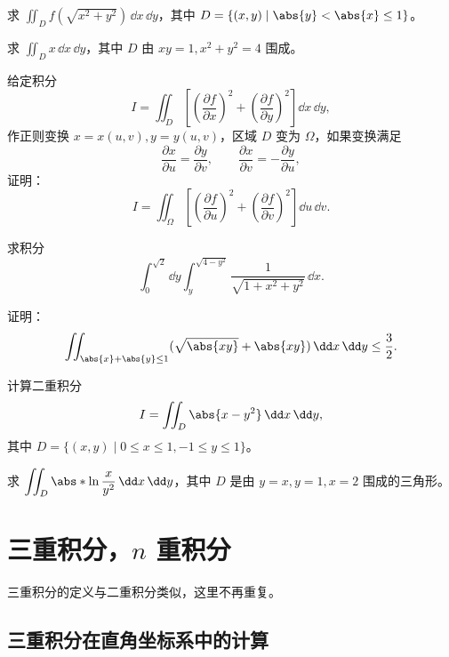 \begin{xexercise}[11]
求 $\displaystyle\iint_D f(\sqrt{x^2+y^2})\,\dd x\,\dd y$，其中 $D=\{(x,y)\mid\abs{y}<\abs{x}\le1\}$。
\end{xexercise}

\begin{xexercise}[12]
求 $\displaystyle\iint_D x\,\dd x\,\dd y$，其中 $D$ 由 $xy=1,x^2+y^2=4$ 围成。
\end{xexercise}

\begin{xexercise}[13]
给定积分
  \[
    I=\iint_D\left[\left(\frac{\partial f}{\partial x}\right)^2+\left(\frac{\partial f}{\partial y}\right)^2\right]\dd x\,\dd y,
  \]
  作正则变换 $x=x(u,v),y=y(u,v)$，区域 $D$ 变为 $\Omega$，如果变换满足
  \[
    \frac{\partial x}{\partial u}=\frac{\partial y}{\partial v},\qquad
    \frac{\partial x}{\partial v}=-\frac{\partial y}{\partial u},
  \]
  证明：
  \[
    I=\iint_\Omega\left[\left(\frac{\partial f}{\partial u}\right)^2+\left(\frac{\partial f}{\partial v}\right)^2\right]\dd u\,\dd v.
  \]
\end{xexercise}

\begin{xexercise}[14]
求积分
  \[
    \int_0^{\sqrt2}\dd y\int_y^{\sqrt{4-y^2}}\frac{1}{\sqrt{1+x^2+y^2}}\,\dd x.
  \]
\end{xexercise}

\begin{xexercise}[15]
证明：
  \[
    \iint_{\abs{x}+\abs{y}\le1}(\sqrt{\abs{xy}}+\abs{xy})\,\dd x\,\dd y\le\frac32.
  \]
\end{xexercise}

\begin{xexercise}[16]
计算二重积分
  \[
    I=\iint_D\abs{x-y^2}\,\dd x\,\dd y,
  \]
  其中 $D=\{(x,y)\mid0\le x\le1,-1\le y\le1\}$。
\end{xexercise}

\begin{xexercise}[17]
求 $\displaystyle\iint_D\abs*{\ln\frac{x}{y^2}}\,\dd x\,\dd y$，其中 $D$ 是由 $y=x,y=1,x=2$ 围成的三角形。
\end{xexercise}

\section{\texorpdfstring{三重积分，$n$ 重积分}{三重积分，n 重积分}}

三重积分的定义与二重积分类似，这里不再重复。

\subsection{三重积分在直角坐标系中的计算}

